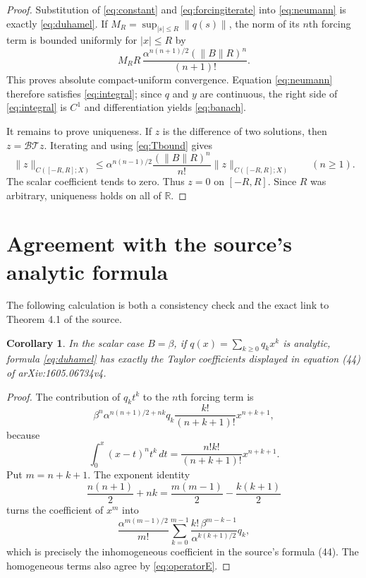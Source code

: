 \documentclass[11pt]{article}
\newtheorem{corollary}{Corollary}
\newcommand{\Bcal}{\mathcal B}
\newcommand{\Tcal}{\mathcal T}
\begin{document}
\begin{proof}
Substitution of \eqref{eq:constant} and \eqref{eq:forcingiterate} into
\eqref{eq:neumann} is exactly \eqref{eq:duhamel}.  If
$M_R=\sup_{|s|\leq R}\|q(s)\|$, the norm of its $n$th forcing term is bounded
uniformly for $|x|\leq R$ by
\begin{equation}\label{eq:forcebound}
 M_R R\,\frac{\alpha^{n(n+1)/2}(\|B\|R)^n}{(n+1)!}.
\end{equation}
This proves absolute compact-uniform convergence.  Equation
\eqref{eq:neumann} therefore satisfies \eqref{eq:integral}; since $q$ and $y$
are continuous, the right side of \eqref{eq:integral} is $C^1$ and
differentiation yields \eqref{eq:banach}.

It remains to prove uniqueness.  If $z$ is the difference of two solutions,
then $z=\Bcal\Tcal z$.  Iterating and using \eqref{eq:Tbound} gives
\[
 \|z\|_{C([-R,R];X)}
 \leq \alpha^{n(n-1)/2}\frac{(\|B\|R)^n}{n!}
 \|z\|_{C([-R,R];X)}
 \qquad(n\geq1).
\]
The scalar coefficient tends to zero.  Thus $z=0$ on $[-R,R]$.  Since $R$ was
arbitrary, uniqueness holds on all of $\mathbb R$.
\end{proof}

\section{Agreement with the source's analytic formula}

The following calculation is both a consistency check and the exact link to
Theorem 4.1 of the source.

\begin{corollary}\label{cor:source}
In the scalar case $B=\beta$, if
$q(x)=\sum_{k\geq0}q_kx^k$ is analytic, formula \eqref{eq:duhamel} has exactly
the Taylor coefficients displayed in equation (44) of arXiv:1605.06734v4.
\end{corollary}

\begin{proof}
The contribution of $q_k t^k$ to the $n$th forcing term is
\[
 \beta^n\alpha^{n(n+1)/2+nk}q_k
 \frac{k!}{(n+k+1)!}x^{n+k+1},
\]
because
\[
 \int_0^x(x-t)^nt^k\,dt
 =\frac{n!k!}{(n+k+1)!}x^{n+k+1}.
\]
Put $m=n+k+1$.  The exponent identity
\[
 \frac{n(n+1)}2+nk
 =\frac{m(m-1)}2-\frac{k(k+1)}2
\]
turns the coefficient of $x^m$ into
\[
 \frac{\alpha^{m(m-1)/2}}{m!}
 \sum_{k=0}^{m-1}
 \frac{k!\,\beta^{m-k-1}}{\alpha^{k(k+1)/2}}q_k,
\]
which is precisely the inhomogeneous coefficient in the source's formula
(44).  The homogeneous terms also agree by \eqref{eq:operatorE}.
\end{proof}
\end{document}
